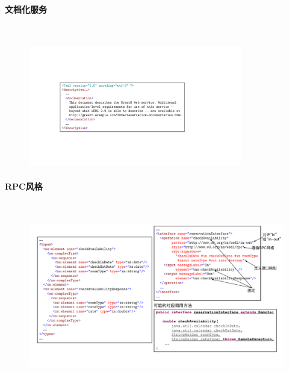 \paragraph*{文档化服务}~{} \par
\begin{figure}[H]
    \vspace{-0.7em}
	\centering
	\includegraphics[width=0.83\textwidth]{images/文档化服务.pdf}
    \vspace{-1.5em}
\end{figure}

\paragraph*{RPC风格}~{} \par
\begin{figure}[H]
    \vspace{-0.7em}
	\centering
	\includegraphics[width=\textwidth]{images/RPC风格.pdf}
    \vspace{-1.5em}
\end{figure}

